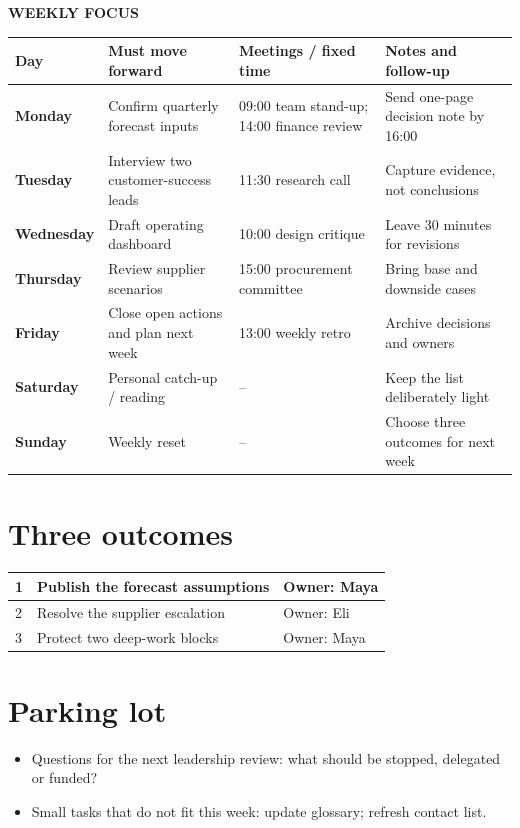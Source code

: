 \documentclass[11pt,a4paper]{article}
\begin{document}
\begin{center}{\color{green}\Huge\bfseries WEEKLY FOCUS}\par\vspace{.2cm}{\Large 9--15 February 2026}\end{center}\vspace{.4cm}
\noindent{}\begin{tabularx}{\textwidth}{>{\bfseries}p{2.1cm}X X X}\toprule Day & Must move forward & Meetings / fixed time & Notes and follow-up\\\midrule
Monday & Confirm quarterly forecast inputs & 09:00 team stand-up; 14:00 finance review & Send one-page decision note by 16:00\\\midrule
Tuesday & Interview two customer-success leads & 11:30 research call & Capture evidence, not conclusions\\\midrule
Wednesday & Draft operating dashboard & 10:00 design critique & Leave 30 minutes for revisions\\\midrule
Thursday & Review supplier scenarios & 15:00 procurement committee & Bring base and downside cases\\\midrule
Friday & Close open actions and plan next week & 13:00 weekly retro & Archive decisions and owners\\\midrule
Saturday & Personal catch-up / reading & -- & Keep the list deliberately light\\\midrule
Sunday & Weekly reset & -- & Choose three outcomes for next week\\\bottomrule\end{tabularx}
\vspace{.8cm}\section*{Three outcomes}\begin{tabularx}{\textwidth}{p{}X p{}}\toprule 1 & Publish the forecast assumptions & Owner: Maya\\\midrule 2 & Resolve the supplier escalation & Owner: Eli\\\midrule 3 & Protect two deep-work blocks & Owner: Maya\\\bottomrule\end{tabularx}
\section*{Parking lot}\begin{itemize}\item Questions for the next leadership review: what should be stopped, delegated or funded?\item Small tasks that do not fit this week: update glossary; refresh contact list.\end{itemize}
\end{document}
